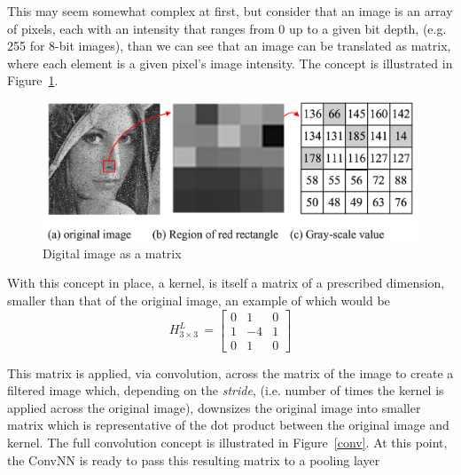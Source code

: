 \documentclass[letterpaper,12pt]{article}
\newcommand{\figref}[1]{Figure~\ref{#1}}
\begin{document}
This may seem somewhat complex at first, but consider that an image is an array of pixels, each with an intensity that ranges from 0 up to a given bit depth, (e.g. 255 for 8-bit images), than we can see that an image can be translated as matrix, where each element is a given pixel's image intensity. The concept is illustrated in \figref{lena}.
\begin{figure}[htbp]
\begin{center}
\includegraphics[scale=0.1]{images/lena.png}
\caption{Digital image as a matrix \cite{lena}}
\label{lena}
\end{center}
\end{figure}

With this concept in place, a kernel, is itself a matrix of a prescribed dimension, smaller than that of the original image,  an example of which would be
\begin{equation}
H_{3 \times 3}^L \, = 
\begin{bmatrix}
  0 & 1  & 0 \\
  1 & -4 & 1 \\
  0 & 1  & 0
\end{bmatrix}
\label{lap_3x3}
\end{equation}

This matrix is applied, via convolution, across the matrix of the image to create a filtered image which, depending on the \textit{stride}, (i.e. number of times the kernel is applied across the original image), downsizes the original image into smaller matrix which is representative of the dot product between the original image and kernel.  The full convolution concept is illustrated in \figref{conv}. At this point, the ConvNN is ready to pass this resulting matrix to a pooling layer
\end{document}
